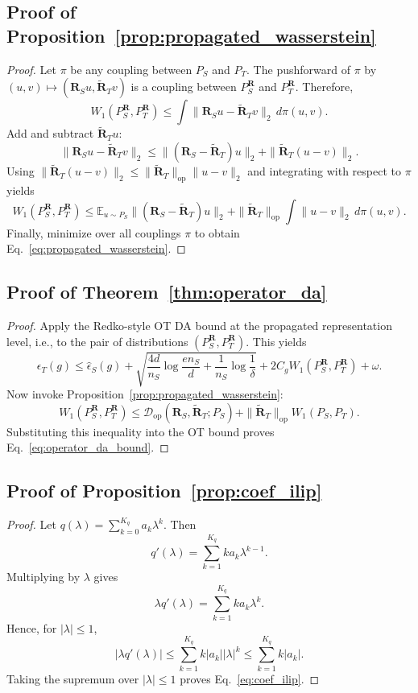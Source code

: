 \documentclass[runningheads]{llncs}
\def\mR{{\mathbf{R}}}
\begin{document}
\subsection{Proof of Proposition~\ref{prop:propagated_wasserstein}}
\label{app:proof_layer}

\begin{proof}
Let $\pi$ be any coupling between $P_S$ and $P_T$. The pushforward of $\pi$ by $(u,v)\mapsto(\mR_Su,\widetilde{\mR}_Tv)$ is a coupling between $P_S^{\mR}$ and $P_T^{\mR}$. Therefore,
\[
W_1(P_S^{\mR},P_T^{\mR})
\le
\int \|\mR_Su-\widetilde{\mR}_Tv\|_2\, d\pi(u,v).
\]
Add and subtract $\widetilde{\mR}_T u$:
\[
\|\mR_Su-\widetilde{\mR}_Tv\|_2
\le
\|(\mR_S-\widetilde{\mR}_T)u\|_2+\|\widetilde{\mR}_T(u-v)\|_2.
\]
Using $\|\widetilde{\mR}_T(u-v)\|_2\le \|\widetilde{\mR}_T\|_{\mathrm{op}}\|u-v\|_2$ and integrating with respect to $\pi$ yields
\[
W_1(P_S^{\mR},P_T^{\mR})
\le
\mathbb E_{u\sim P_S}\|(\mR_S-\widetilde{\mR}_T)u\|_2
+\|\widetilde{\mR}_T\|_{\mathrm{op}}\int\|u-v\|_2\,d\pi(u,v).
\]
Finally, minimize over all couplings $\pi$ to obtain Eq.~\eqref{eq:propagated_wasserstein}.
\end{proof}

\subsection{Proof of Theorem~\ref{thm:operator_da}}
\label{app:proof_operator_da}

\begin{proof}
Apply the Redko-style OT DA bound at the propagated representation level, i.e., to the pair of distributions $(P_S^{\mR},P_T^{\mR})$. This yields
\[
\epsilon_T(g)
\le
\widehat\epsilon_S(g)
+\sqrt{
\frac{4d}{n_S}\log\frac{en_S}{d}
+
\frac{1}{n_S}\log\frac{1}{\delta}
}
+2C_gW_1(P_S^{\mR},P_T^{\mR})+\omega.
\]
Now invoke Proposition~\ref{prop:propagated_wasserstein}:
\[
W_1(P_S^{\mR},P_T^{\mR})
\le
\mathcal D_{\mathrm{op}}(\mR_S,\widetilde{\mR}_T;P_S)
+
\|\widetilde{\mR}_T\|_{\mathrm{op}}W_1(P_S,P_T).
\]
Substituting this inequality into the OT bound proves Eq.~\eqref{eq:operator_da_bound}.
\end{proof}

\subsection{Proof of Proposition~\ref{prop:coef_ilip}}
\label{app:proof_coefilip}

\begin{proof}
Let $q(\lambda)=\sum_{k=0}^{K_q}a_k\lambda^k$. Then
\[
q'(\lambda)=\sum_{k=1}^{K_q}ka_k\lambda^{k-1}.
\]
Multiplying by $\lambda$ gives
\[
\lambda q'(\lambda)=\sum_{k=1}^{K_q}ka_k\lambda^k.
\]
Hence, for $|\lambda|\le 1$,
\[
|\lambda q'(\lambda)|
\le
\sum_{k=1}^{K_q}k|a_k||\lambda|^k
\le
\sum_{k=1}^{K_q}k|a_k|.
\]
Taking the supremum over $|\lambda|\le 1$ proves Eq.~\eqref{eq:coef_ilip}.
\end{proof}
\end{document}
